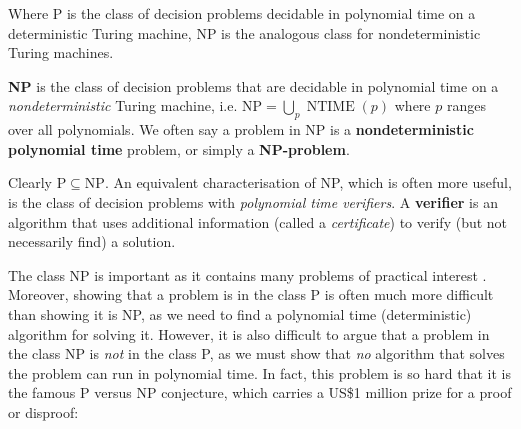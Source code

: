 Where P is the class of decision problems decidable in polynomial time on a deterministic Turing machine, NP is the analogous class for nondeterministic Turing machines.

\begin{definition}\label{def:class_NP}
    \textbf{NP} is the class of decision problems that are decidable in polynomial time on a \textit{nondeterministic} Turing machine, i.e. $\mathrm{NP} = \bigcup_p \operatorname{NTIME}(p)$ where $p$ ranges over all polynomials. We often say a problem in NP is a \textbf{nondeterministic polynomial time} problem, or simply a \textbf{NP-problem}.
\end{definition}

Clearly $\mathrm{P} \subseteq \mathrm{NP}$. An equivalent characterisation of NP, which is often more useful, is the class of decision problems with \textit{polynomial time verifiers}. A \textbf{verifier} is an algorithm that uses additional information (called a \textit{certificate}) to verify (but not necessarily find) a solution.


The class NP is important as it contains many problems of practical interest . Moreover, showing that a problem is in the class P is often much more difficult than showing it is NP, as we need to find a polynomial time (deterministic) algorithm for solving it. However, it is also difficult to argue that a problem in the class NP is \textit{not} in the class P, as we must show that \textit{no} algorithm that solves the problem can run in polynomial time. In fact, this problem is so hard that it is the famous $\mathrm{P}$ versus $\mathrm{NP}$ conjecture, which carries a US\$1 million prize for a proof or disproof:

\begin{conjecture}\label{conj:P_equals_NP}
\end{conjecture}

